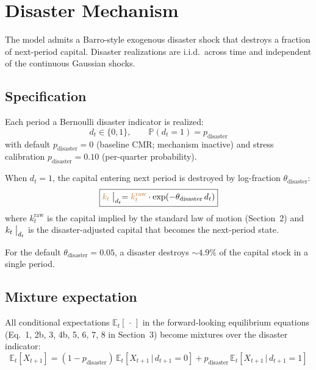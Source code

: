 \documentclass[11pt]{article}
\begin{document}
\section{Disaster Mechanism}
\label{sec:disaster}

The model admits a Barro-style exogenous disaster shock that destroys a
fraction of next-period capital. Disaster realizations are i.i.d.\ across
time and independent of the continuous Gaussian shocks.

\subsection{Specification}

Each period a Bernoulli disaster indicator is realized:
\begin{equation*}
  d_t \in \{0, 1\}, \qquad
  \mathbb{P}(d_t = 1) = p_{\text{disaster}}
\end{equation*}
with default $p_{\text{disaster}} = 0$ (baseline CMR; mechanism
inactive) and stress calibration $p_{\text{disaster}} = 0.10$
(per-quarter probability).

When $d_t = 1$, the capital entering next period is destroyed by
log-fraction $\theta_{\text{disaster}}$:
\begin{equation*}
  \boxed{\textcolor{brown}{k_t}\bigm|_{d_t}
    = \textcolor{brown}{k_t^{\text{raw}}}
      \cdot \exp(-\theta_{\text{disaster}}\, d_t)}
\end{equation*}
where $k_t^{\text{raw}}$ is the capital implied by the standard law of
motion (Section~2) and $k_t\bigm|_{d_t}$ is the disaster-adjusted
capital that becomes the next-period state.

For the default $\theta_{\text{disaster}} = 0.05$, a disaster destroys
${\sim}4.9\%$ of the capital stock in a single period.

\subsection{Mixture expectation}

All conditional expectations $\mathbb{E}_t[\,\cdot\,]$ in the
forward-looking equilibrium equations (Eq.~1, 2b, 3, 4b, 5, 6, 7, 8 in
Section~3) become mixtures over the disaster indicator:
\begin{equation*}
  \boxed{\mathbb{E}_t[X_{t+1}]
    = (1 - p_{\text{disaster}})\,
      \mathbb{E}_t\!\left[X_{t+1} \,\big|\, d_{t+1} = 0\right]
    + p_{\text{disaster}}\,
      \mathbb{E}_t\!\left[X_{t+1} \,\big|\, d_{t+1} = 1\right]}
\end{equation*}
\end{document}
